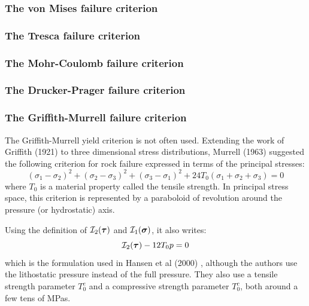 \subsubsection{The von Mises failure criterion}\label{sec:vMcriterion}


\subsubsection{The Tresca failure criterion}


\subsubsection{The Mohr-Coulomb failure criterion}


\subsubsection{The Drucker-Prager failure criterion}


\subsubsection{The Griffith-Murrell failure criterion}

The Griffith-Murrell yield criterion \cite{brau94,brbe95,babr97} is not often used. 
Extending the work of Griffith (1921) to three dimensional stress distributions, 
Murrell (1963) suggested the following criterion for rock failure expressed 
in terms of the principal stresses:
\[
(\sigma_1-\sigma_2)^2 + (\sigma_2-\sigma_3)^2 + (\sigma_3-\sigma_1)^2
+
24T_0 (\sigma_1+\sigma_2+\sigma_3)=0
\]
where $T_0$ is a material property called the tensile strength. In principal stress space, 
this criterion is represented by a paraboloid of revolution around the pressure (or hydrostatic) axis.

Using the definition of ${\cal I}_2({\bm \tau})$ and ${\cal I}_1({\bm \sigma})$, it also writes:
\[
{\cal I}_2({\bm \tau}) - 12 T_0 p =0
\]
which is the formulation used in Hansen et al (2000) \cite{hanl00}, although the authors
use the lithostatic pressure instead of the full pressure. They also use a tensile 
strength parameter $T_0^e$ and a compressive strength parameter $T_0^c$, both around a few tens 
of MPas.

